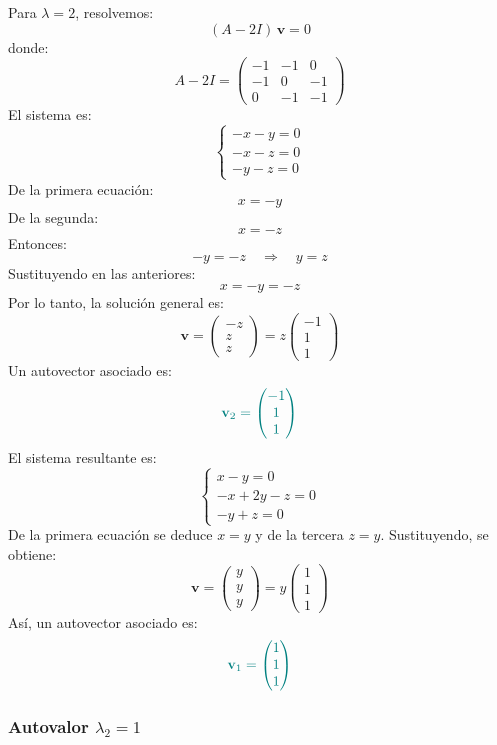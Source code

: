 \documentclass{article}
\begin{document}
\begin{enumerate}[label=\textbf{\alph*)}]
Para \(\lambda = 2\), resolvemos:
\[
(A - 2I)\,\mathbf{v} = 0
\]
donde:
\[
A - 2I =
\begin{pmatrix}
-1 & -1 & 0\\
-1 & 0 & -1\\
0 & -1 & -1
\end{pmatrix}
\]
El sistema es:
\[
\begin{cases}
- x - y = 0\\[4pt]
- x - z = 0\\[4pt]
- y - z = 0
\end{cases}
\]
De la primera ecuación:
\[
x = -y
\]
De la segunda:
\[
x = -z
\]
Entonces:
\[
-y = -z
\quad\Longrightarrow\quad
y = z
\]
Sustituyendo en las anteriores:
\[
x = -y = -z
\]
Por lo tanto, la solución general es:
\[
\mathbf{v} =
\begin{pmatrix}
- z\\
z\\
z
\end{pmatrix}
=
z\begin{pmatrix}
-1\\
1\\
1
\end{pmatrix}
\]
Un autovector asociado es:
\[
\color{teal}
\mathbf{v}_2 =
\begin{pmatrix}
-1\\
1\\
1
\end{pmatrix}
\]
El sistema resultante es:
\[
\begin{cases}
x - y = 0\\[2mm]
- x + 2y - z = 0\\[2mm]
- y + z = 0
\end{cases}
\]
De la primera ecuación se deduce \(x = y\) y de la tercera \(z = y\).  
Sustituyendo, se obtiene:
\[
\mathbf{v} =
\begin{pmatrix}
y\\
y\\
y
\end{pmatrix}
=
y\begin{pmatrix}
1\\
1\\
1
\end{pmatrix}
\]
Así, un autovector asociado es:
\[
\color{teal}
\mathbf{v}_1 =
\begin{pmatrix}
1\\
1\\
1
\end{pmatrix}
\]

\subsubsection*{Autovalor \(\lambda_2 = 1\)}


\end{enumerate}
\end{document}
